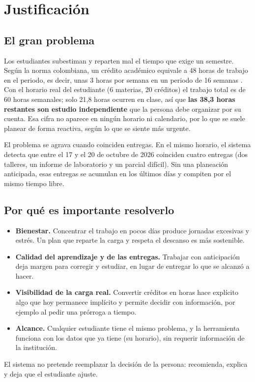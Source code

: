 \section{Justificación}\label{sec:just}

\subsection{El gran problema}

Los estudiantes subestiman y reparten mal el tiempo que exige un semestre. Según la norma colombiana, un crédito académico equivale a 48 horas de trabajo en el periodo, es decir, unas 3 horas por semana en un periodo de 16 semanas \parencite{MEN2019}. Con el horario real del estudiante (6 materias, 20 créditos) el trabajo total es de 60 horas semanales; solo 21,8 horas ocurren en clase, así que \textbf{las 38,3 horas restantes son estudio independiente} que la persona debe organizar por su cuenta. Esa cifra no aparece en ningún horario ni calendario, por lo que se suele planear de forma reactiva, según lo que se siente más urgente.

El problema se agrava cuando coinciden entregas. En el mismo horario, el sistema detecta que entre el 17 y el 20 de octubre de 2026 coinciden cuatro entregas (dos talleres, un informe de laboratorio y un parcial difícil). Sin una planeación anticipada, esas entregas se acumulan en los últimos días y compiten por el mismo tiempo libre.

\subsection{Por qué es importante resolverlo}

\begin{itemize}
    \item \textbf{Bienestar.} Concentrar el trabajo en pocos días produce jornadas excesivas y estrés. Un plan que reparte la carga y respeta el descanso es más sostenible.
    \item \textbf{Calidad del aprendizaje y de las entregas.} Trabajar con anticipación deja margen para corregir y estudiar, en lugar de entregar lo que se alcanzó a hacer.
    \item \textbf{Visibilidad de la carga real.} Convertir créditos en horas hace explícito algo que hoy permanece implícito y permite decidir con información, por ejemplo al pedir una prórroga a tiempo.
    \item \textbf{Alcance.} Cualquier estudiante tiene el mismo problema, y la herramienta funciona con los datos que ya tiene (su horario), sin requerir información de la institución.
\end{itemize}

El sistema no pretende reemplazar la decisión de la persona: recomienda, explica y deja que el estudiante ajuste.
